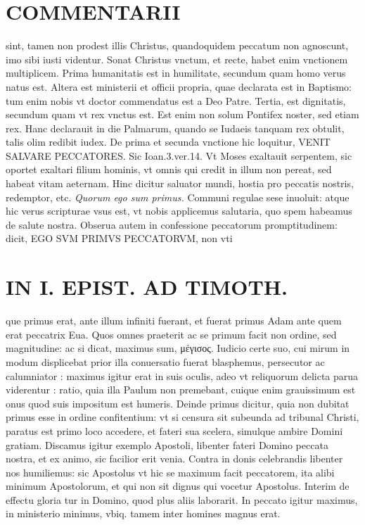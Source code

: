 \documentclass{article}
\begin{document}
\begin{pages}
\section*{COMMENTARII }
\marginpar{[ p.34 ]}\pstart sint, tamen non prodest illis Christus, quandoquidem peccatum non agnoscunt, imo sibi iusti videntur.  \pend\pstart Sonat Christus vnctum, et recte, habet enim vnctionem multiplicem. Prima humanitatis est in humilitate, secundum quam homo verus natus est. Altera est ministerii et officii propria, quae declarata est in Baptismo: tum enim nobis vt doctor commendatus est a Deo Patre. Tertia, est dignitatis, secundum quam vt rex vnctus est. Est enim non solum Pontifex noster, sed etiam rex. Hanc declarauit in die Palmarum, quando se Iudaeis tanquam rex obtulit, talis olim redibit iudex.  \pend\pstart De prima et secunda vnctione hic loquitur, VENIT SALVARE PECCATORES. Sic Ioan.3.ver.14. Vt Moses exaltauit serpentem, sic oportet exaltari filium hominis, vt omnis qui credit in illum non pereat, sed habeat vitam aeternam. Hinc dicitur saluator mundi, hostia pro peccatis nostris, redemptor, etc.  \pend
\textit{Quorum ego sum primus. }\pstart Communi regulae sese inuoluit: atque hic verus scripturae vsus est, vt nobis applicemus salutaria, quo spem habeamus de salute nostra. Obserua autem in confessione peccatorum promptitudinem: dicit, EGO SVM PRIMVS PECCATORVM, non vti\pend
\section*{IN I. EPIST. AD TIMOTH. }
\marginpar{[ p.35 ]}\pstart que primus erat, ante illum infiniti fuerant, et fuerat primus Adam ante quem erat peccatrix Eua. Quos omnes praeterit ac se primum facit non ordine, sed magnitudine: ac si dicat, maximus sum, μέγισος. Iudicio certe suo, cui mirum in modum displicebat prior illa conuersatio fuerat blasphemus, persecutor ac calumniator : maximus igitur erat in suis oculis, adeo vt reliquorum delicta parua viderentur : ratio, quia illa Paulum non premebant, cuique enim grauissimum est onus quod suis impositum est humeris. Deinde primus dicitur, quia non dubitat primus esse in ordine confitentium: vt si censura sit subeunda ad tribunal Christi, paratus est primo loco accedere, et fateri sua scelera, simulque ambire Domini gratiam. Discamus igitur exemplo Apostoli, libenter fateri Domino peccata nostra, et ex animo, sic facilior erit venia. Contra in donis celebrandis libenter nos humiliemus: sic Apostolus vt hic se maximum facit peccatorem, ita alibi minimum Apostolorum, et qui non sit dignus qui vocetur Apostolus. Interim de effectu gloria tur in Domino, quod plus aliis laborarit. In peccato igitur maximus, in ministerio minimus, vbiq. tamem inter homines magnus erat.  \pend

\end{pages}
\end{document}
